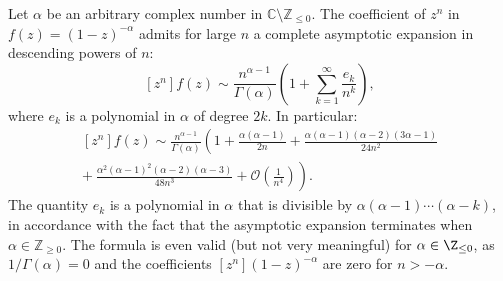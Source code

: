 \begin{theorem}\label{thm:standard_function_scale}
  Let $\alpha$ be an arbitrary complex number in $\mathbb{C} \setminus \mathbb{Z}_{\leq 0}$. The coefficient of $z^n$ in $f(z) = (1-z)^{-\alpha}$ admits for large $n$ a complete asymptotic expansion in descending powers of $n$:
  $$
    [z^n]f(z) \sim \frac{n^{\alpha -1}}{\Gamma(\alpha)}\left(1 + \sum_{k=1}^{\infty} \frac{e_k}{n^k}\right),
  $$
  where $e_k$ is a polynomial in $\alpha$ of degree $2k$. In particular: 
  \begin{equation*}
    \begin{split}
      [z^n]f(z) \sim \frac{n^{\alpha-1}}{\Gamma(\alpha)}\left(1 + \frac{\alpha(\alpha - 1)}{2n} + \frac{\alpha(\alpha - 1)(\alpha - 2)(3\alpha - 1)}{24n^2} \right. \\
      \left. + \ \frac{\alpha^2(\alpha -1)^2(\alpha -2)(\alpha - 3)}{48n^3} + \mathcal{O}\left(\frac{1}{n^4}\right)\right).
    \end{split}
  \end{equation*}
  The quantity $e_k$ is a polynomial in $\alpha$ that is divisible by $\alpha(\alpha - 1)\cdots(\alpha -k)$, in accordance with the fact that the asymptotic expansion terminates when $\alpha \in \mathbb{Z}_{\geq 0}$. The formula is even valid (but not very meaningful) for $\alpha \in \Z_{\leq 0}$, as $1/\Gamma(\alpha) = 0$ and the coefficients $[z^n](1-z)^{-\alpha}$ are zero for $n > -\alpha$.
\end{theorem}

